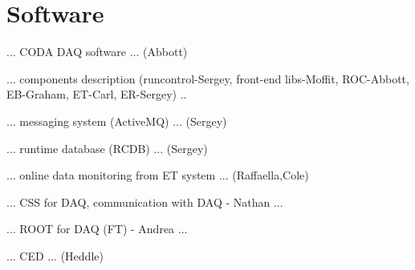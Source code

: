 \section{Software}

... CODA DAQ software ... (Abbott)

... components description (runcontrol-Sergey, front-end libs-Moffit, ROC-Abbott, EB-Graham, ET-Carl, ER-Sergey) ..



... messaging system (ActiveMQ) ... (Sergey)

... runtime database (RCDB) ... (Sergey)

... online data monitoring from ET system ... (Raffaella,Cole)

... CSS for DAQ, communication with DAQ - Nathan ...

... ROOT for DAQ (FT) - Andrea ...

... CED ... (Heddle)
